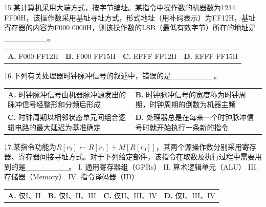 \documentclass[UTF8,11pt]{ctexart}
\begin{document}
15.某计算机采用大端方式，按字节编址。某指令中操作数的机器数为1234 FF00H，该操作数采用基址寻址方式，形式地址（用补码表示）为FF12H，基址寄存器的内容为F000 0000H，则该操作数的LSB（最低有效字节）所在的地址是\_\_\_\_\_\_\_\_。


\begin{center}\begin{tabular}{>{\raggedright\arraybackslash}p{\dimexpr(\linewidth-8\tabcolsep)/4\relax}>{\raggedright\arraybackslash}p{\dimexpr(\linewidth-8\tabcolsep)/4\relax}>{\raggedright\arraybackslash}p{\dimexpr(\linewidth-8\tabcolsep)/4\relax}>{\raggedright\arraybackslash}p{\dimexpr(\linewidth-8\tabcolsep)/4\relax}}
\textbf{A.} F000 FF12H & \textbf{B.} F000 FF15H & \textbf{C.} EFFF FF12H & \textbf{D.} EFFF FF15H\\[.35em]\end{tabular}\end{center}

16.下列有关处理器时钟脉冲信号的叙述中，错误的是\_\_\_\_\_\_\_\_。


\begin{center}\begin{tabular}{>{\raggedright\arraybackslash}p{\dimexpr(\linewidth-4\tabcolsep)/2\relax}>{\raggedright\arraybackslash}p{\dimexpr(\linewidth-4\tabcolsep)/2\relax}}
\textbf{A.} 时钟脉冲信号由机器脉冲源发出的脉冲信号经整形和分频后形成 & \textbf{B.} 时钟脉冲信号的宽度称为时钟周期，时钟周期的倒数为机器主频\\[.35em]
\textbf{C.} 时钟周期以相邻状态单元间组合逻辑电路的最大延迟为基准确定 & \textbf{D.} 处理器总是在每来一个时钟脉冲信号时就开始执行一条新的指令\\[.35em]\end{tabular}\end{center}

17.某指令功能为\(\displaystyle R[r_2]\leftarrow R[r_1]+M[R[r_0]]\)，其两个源操作数分别采用寄存器、寄存器间接寻址方式。对于下列给定部件，该指令在取数及执行过程中需要用到的是\_\_\_\_\_\_\_\_。 I. 通用寄存器组（GPRs） II. 算术逻辑单元（ALU） III. 存储器（Memory） IV. 指令译码器（ID）


\begin{center}\begin{tabular}{>{\raggedright\arraybackslash}p{\dimexpr(\linewidth-8\tabcolsep)/4\relax}>{\raggedright\arraybackslash}p{\dimexpr(\linewidth-8\tabcolsep)/4\relax}>{\raggedright\arraybackslash}p{\dimexpr(\linewidth-8\tabcolsep)/4\relax}>{\raggedright\arraybackslash}p{\dimexpr(\linewidth-8\tabcolsep)/4\relax}}
\textbf{A.} 仅I、II & \textbf{B.} 仅I、II、III & \textbf{C.} 仅II、III、IV & \textbf{D.} 仅I、III、IV\\[.35em]\end{tabular}\end{center}
\end{document}
